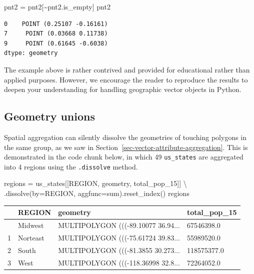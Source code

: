 \documentclass[
  letterpaper,
]{krantz}
\newenvironment{Shaded}{\begin{snugshade}}{\end{snugshade}}
\newcommand{\NormalTok}[1]{\textcolor[rgb]{0.00,0.23,0.31}{#1}}
\newcommand{\OperatorTok}[1]{\textcolor[rgb]{0.37,0.37,0.37}{#1}}
\newcommand{\StringTok}[1]{\textcolor[rgb]{0.13,0.47,0.30}{#1}}
\begin{document}
\begin{Shaded}
\begin{Highlighting}[]
\NormalTok{pnt2 }\OperatorTok{=}\NormalTok{ pnt2[}\OperatorTok{\textasciitilde{}}\NormalTok{pnt2.is\_empty]}
\NormalTok{pnt2}
\end{Highlighting}
\end{Shaded}

\begin{verbatim}
0    POINT (0.25107 -0.16161)
7     POINT (0.03668 0.11738)
9     POINT (0.61645 -0.6038)
dtype: geometry
\end{verbatim}

The example above is rather contrived and provided for educational
rather than applied purposes. However, we encourage the reader to
reproduce the results to deepen your understanding for handling
geographic vector objects in Python.

\subsection{Geometry unions}\label{sec-geometry-unions}

Spatial aggregation can silently dissolve the geometries of touching
polygons in the same group, as we saw in
Section~\ref{sec-vector-attribute-aggregation}. This is demonstrated in
the code chunk below, in which 49 \texttt{us\_states} are aggregated
into 4 regions using the \texttt{.dissolve} method.

\begin{Shaded}
\begin{Highlighting}[]
\NormalTok{regions }\OperatorTok{=}\NormalTok{ us\_states[[}\StringTok{\textquotesingle{}REGION\textquotesingle{}}\NormalTok{, }\StringTok{\textquotesingle{}geometry\textquotesingle{}}\NormalTok{, }\StringTok{\textquotesingle{}total\_pop\_15\textquotesingle{}}\NormalTok{]] }\OperatorTok{\textbackslash{}}
\NormalTok{    .dissolve(by}\OperatorTok{=}\StringTok{\textquotesingle{}REGION\textquotesingle{}}\NormalTok{, aggfunc}\OperatorTok{=}\StringTok{\textquotesingle{}sum\textquotesingle{}}\NormalTok{).reset\_index()}
\NormalTok{regions}
\end{Highlighting}
\end{Shaded}

\begin{longtable}[]{@{}llll@{}}
\toprule\noalign{}
& REGION & geometry & total\_pop\_15 \\
\midrule\noalign{}
\endhead
\bottomrule\noalign{}
\endlastfoot
0 & Midwest & MULTIPOLYGON (((-89.10077 36.94... & 67546398.0 \\
1 & Norteast & MULTIPOLYGON (((-75.61724 39.83... & 55989520.0 \\
2 & South & MULTIPOLYGON (((-81.3855 30.273... & 118575377.0 \\
3 & West & MULTIPOLYGON (((-118.36998 32.8... & 72264052.0 \\
\end{longtable}
\end{document}

